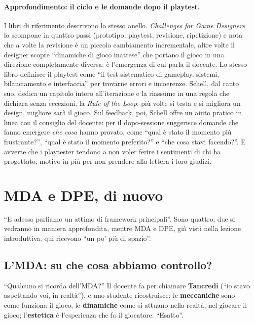 \paragraph{Approfondimento: il ciclo e le domande dopo il playtest.} I libri di
riferimento descrivono lo stesso anello. \emph{Challenges for Game Designers}
lo scompone in quattro passi (prototipo, playtest, revisione, ripetizione) e
nota che a volte la revisione è un piccolo cambiamento incrementale, altre volte
il designer scopre ``dinamiche di gioco inattese'' che portano il gioco in una
direzione completamente diversa: è l'emergenza di cui parla il docente. Lo
stesso libro definisce il playtest come ``il test sistematico di gameplay,
sistemi, bilanciamento e interfaccia'' per trovarne errori e incoerenze. Schell,
dal canto suo, dedica un capitolo intero all'iterazione e la riassume in una
regola che dichiara senza eccezioni, la \emph{Rule of the Loop}: più volte si
testa e si migliora un design, migliore sarà il gioco. Sul feedback, poi, Schell
offre un aiuto pratico in linea con il consiglio del docente: per il dopo-sessione
suggerisce domande che fanno emergere \emph{che cosa} hanno provato, come ``qual è stato il
momento più frustrante?'', ``qual è stato il momento preferito?'' e ``che cosa
stavi facendo?''. E avverte che i playtester tendono a non voler ferire i
sentimenti di chi ha progettato, motivo in più per non prendere alla lettera i
loro giudizi.

\section{MDA e DPE, di nuovo}
\label{a3:sec:mda}

``E adesso parliamo un attimo di framework principali''. Sono quattro; due si
vedranno in maniera approfondita, mentre MDA e DPE, già visti nella lezione
introduttiva, qui ricevono ``un po' più di spazio''.

\subsection{L'MDA: su che cosa abbiamo controllo?}



``Qualcuno si ricorda dell'MDA?'' Il docente fa per chiamare \textbf{Tancredi}
(``io stavo aspettando voi, in realtà''), e uno studente ricostruisce: le
\textbf{meccaniche} sono come funziona il gioco; le \textbf{dinamiche} come si
attuano nella realtà, nel giocare il gioco; l'\textbf{estetica} è l'esperienza
che fa il giocatore. ``Esatto''.

